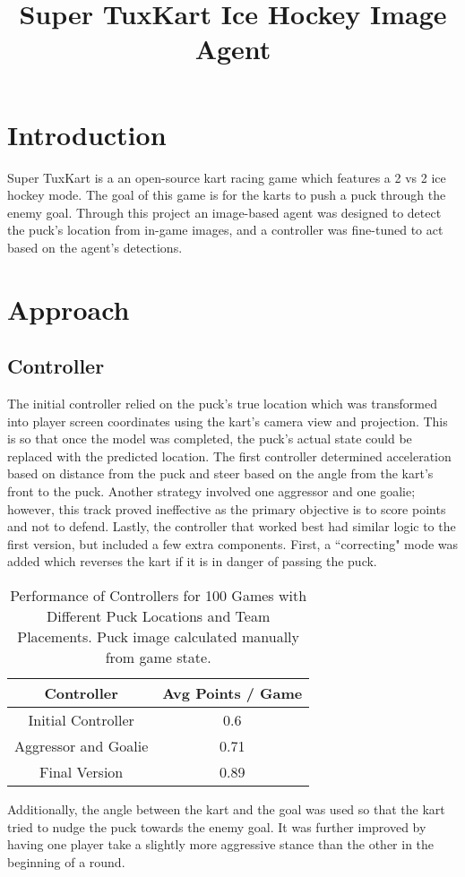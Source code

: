 \documentclass[11pt,a4paper]{article}
\title{Super TuxKart Ice Hockey Image Agent}
\date{}
\begin{document}
\maketitle
\begin{center}
\end{center}


\section{Introduction}

Super TuxKart is a an open-source kart racing game which features a 2 vs 2 ice hockey mode. The goal of this game is for the karts to push a puck through the enemy goal. Through this project an image-based agent was designed to detect the puck's location from in-game images, and a controller was fine-tuned to act based on the agent's detections. 





\section{Approach}

\subsection{Controller}

The initial controller relied on the puck's true location which was transformed into player screen coordinates using the kart's camera view and projection. This is so that once the model was completed, the puck's actual state could be replaced with the predicted location. The first controller determined acceleration based on distance from the puck and steer based on the angle from the kart's front to the puck. Another strategy involved one aggressor and one goalie; however, this track proved ineffective as the primary objective is to score points and not to defend. Lastly, the controller that worked best had similar logic to the first version, but included a few extra components. First, a “correcting" mode was added which reverses the kart if it is in danger of passing the puck.
\begin{table}[h!]
\centering
\begin{tabular}{||c c||} 
 \hline
 Controller & Avg Points / Game \\ [0.5ex] 
 \hline\hline
  Initial Controller & 0.6 \\
 Aggressor and Goalie & 0.71 \\
 Final Version & 0.89 \\[1ex] 
 \hline
\end{tabular}
\caption{Performance of Controllers for 100 Games with Different Puck Locations and Team Placements. Puck image calculated manually from game state.}
\label{table:1}
\end{table}
 Additionally, the angle between the kart and the goal was used so that the kart tried to nudge the puck towards the enemy goal. It was further improved by having one player take a slightly more aggressive stance than the other in the beginning of a round.
\end{document}
